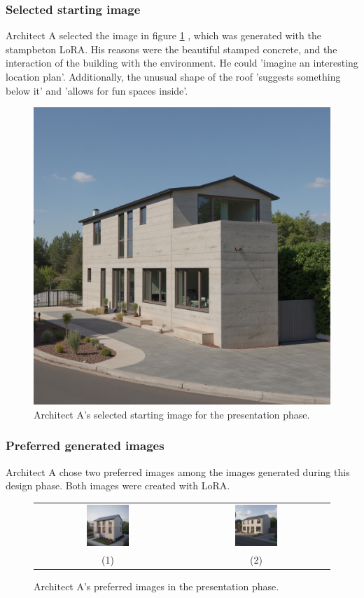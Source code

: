 \subsubsection{Selected starting image}
Architect A selected the image in figure \ref{fig:A-presentation-selected} , which was generated with the stampbeton LoRA. His reasons were the beautiful stamped concrete, and the interaction of the building with the environment. He could 'imagine an interesting location plan'. Additionally, the unusual shape of the roof 'suggests something below it' and 'allows for fun spaces inside'.
\begin{figure}[H]
    \centering
    \includegraphics[width=0.3\linewidth]{Images/Results/Architect-A_Fixed-images/3-presentation/Met_lora_00097_.png}
    \caption{Architect A's selected starting image for the presentation phase.}
    \label{fig:A-presentation-selected}
\end{figure}

\subsubsection{Preferred generated images}
Architect A chose two preferred images among the images generated during this design phase. Both images were created with LoRA.
\begin{figure}[H]
    \centering
    \begin{tabular}{cc}
        \includegraphics[width=0.3\textwidth]{Images/Results/Architect A/3. Presentation phase/Met_lora_00002_.png} & \includegraphics[width=0.3\textwidth]{Images/Results/Architect A/3. Presentation phase/Met_lora_00006_.png}\\ 
        (1) & (2)\\
    \end{tabular}
    \caption{Architect A's preferred images in the presentation phase.}
    \label{fig:A-presentation-preferred}
\end{figure}
